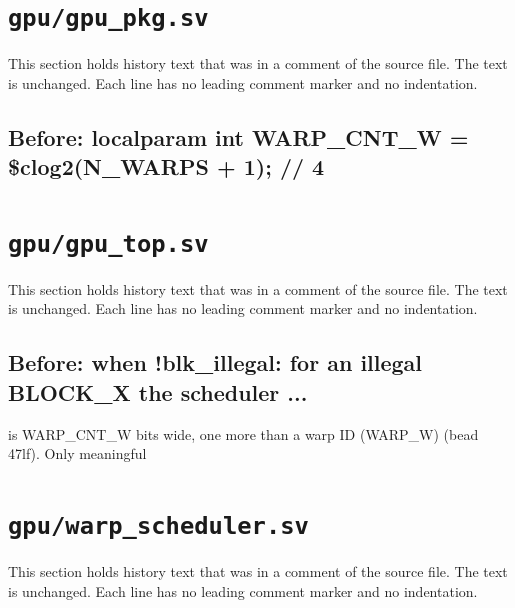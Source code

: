 \section{\texttt{gpu/gpu\_pkg.sv}}\label{cr:mod:gpu-pkg}

This section holds history text that was in a comment of the source file. The text is unchanged. Each line has no leading comment marker and no indentation.

\begin{record}

\subsection*{Before: localparam int WARP\_CNT\_W = \$clog2(N\_WARPS + 1); // 4}


\end{record}

\section{\texttt{gpu/gpu\_top.sv}}\label{cr:mod:gpu-top}

This section holds history text that was in a comment of the source file. The text is unchanged. Each line has no leading comment marker and no indentation.

\begin{record}

\subsection*{Before: when !blk\_illegal: for an illegal BLOCK\_X the scheduler ...}

\begin{textblock}
is WARP_CNT_W bits wide, one more than a warp ID (WARP_W) (bead 47lf).  Only meaningful
\end{textblock}

\end{record}

\section{\texttt{gpu/warp\_scheduler.sv}}\label{cr:mod:warp-scheduler}

This section holds history text that was in a comment of the source file. The text is unchanged. Each line has no leading comment marker and no indentation.

